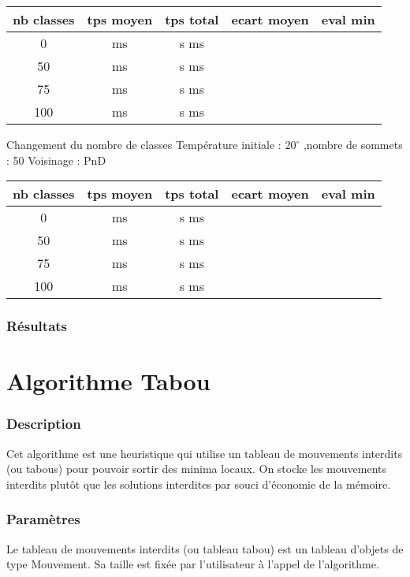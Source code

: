 \documentclass[12pt]{article}
\begin{document}
\begin{tabular}{|c|c|c|c|c|}
	\hline 
	nb classes & tps moyen & tps total & ecart moyen & eval min\\
	\hline
	0 &  ms &  s  ms &  &  \\
	\hline
	50  &     ms   &    s    ms   &     &     \\
	\hline
	75  &     ms   &   s    ms    &     &     \\
	\hline
	100  &      ms  &    s    ms   &     &     \\
	\hline
\end{tabular}

\bigskip

Changement du nombre de classes
Température initiale : $20^\circ$ ,nombre de sommets : 50 Voisinage : PnD

\begin{tabular}{|c|c|c|c|c|}
	\hline 
	nb classes & tps moyen & tps total & ecart moyen & eval min\\
	\hline
	0 &  ms &  s  ms &  &  \\
	\hline
	50  &     ms   &    s    ms   &     &     \\
	\hline
	75  &     ms   &   s    ms    &     &     \\
	\hline
	100  &      ms  &    s    ms   &     &     \\
	\hline
\end{tabular}

\section{Résultats}


\newpage

\part{Algorithme Tabou}
\section{Description}
Cet algorithme est une heuristique qui utilise un tableau de mouvements interdits (ou tabous) pour pouvoir sortir des minima locaux. On stocke les mouvements interdits plutôt que les solutions interdites par souci d’économie de la mémoire.

\section{Paramètres}
Le tableau de mouvements interdits (ou tableau tabou) est un tableau d’objets de type Mouvement. Sa taille est fixée par l’utilisateur à l’appel de l’algorithme.
\end{document}
